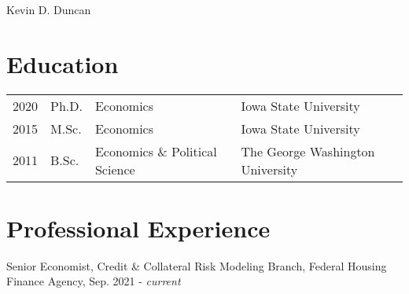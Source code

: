 \documentclass[letterpaper]{article}
\def\name{Kevin D. Duncan}
\begin{document}
{\huge \name} 


\vspace{0.25in}



\section*{Education}

\begin{tabular}{@{}llll}
  2020  & Ph.D. & Economics &Iowa State University \\
    2015 &M.Sc. & Economics &Iowa State University \\
  2011 & B.Sc. & Economics \& Political Science & The George Washington University
\end{tabular}

\section*{Professional Experience}

Senior Economist, Credit \& Collateral Risk Modeling Branch, Federal Housing Finance Agency, Sep. 2021 - \textit{current}
\end{document}
